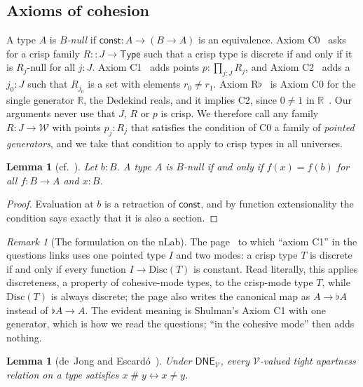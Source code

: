 \documentclass[11pt]{amsart}
\newtheorem{lemma}[theorem]{Lemma}
\theoremstyle{definition}
\theoremstyle{remark}
\newtheorem{remark}[theorem]{Remark}
\newcommand{\V}{\mathcal V}
\newcommand{\W}{\mathcal W}
\newcommand{\R}{\mathbb R}
\newcommand{\crisp}{\mathrel{::}}
\newcommand{\DNE}{\mathsf{DNE}}
\newcommand{\const}{\mathsf{const}}
\newcommand{\ap}{\mathrel{\#}}
\begin{document}
\subsection*{Axioms of cohesion}
A type $A$ is \emph{$B$-null} if $\const:A\to(B\to A)$ is an
equivalence. Axiom C0~\cite[\S8.1]{Shulman2018} asks for a crisp family
$R\crisp J\to\mathsf{Type}$ such that a crisp type is discrete if and
only if it is $R_j$-null for all $j:J$. Axiom
C1~\cite[\S8.2]{Shulman2018} adds points $p:\prod_{j:J}R_j$, and Axiom
C2~\cite[\S9]{Shulman2018} adds a $j_0:J$ such that $R_{j_0}$ is a set
with elements $r_0\neq r_1$. Axiom R$\flat$~\cite[\S8]{Shulman2018} is
Axiom C0 for the single generator $\R$, the Dedekind reals, and it implies
C2, since $0\neq1$ in $\R$~\cite[\S9]{Shulman2018}. Our arguments never
use that $J$, $R$ or $p$ is crisp. We therefore call any family
$R:J\to\W$ with points $p_j:R_j$ that satisfies the condition of C0 a
family of \emph{pointed generators}, and we take that condition to apply
to crisp types in all universes.

\begin{lemma}[{cf.~\cite[Lemma~8.7]{Shulman2018}}]\label{lem:null}
Let $b:B$. A type $A$ is $B$-null if and only if $f(x)=f(b)$ for all
$f:B\to A$ and $x:B$.
\end{lemma}

\begin{proof}
Evaluation at $b$ is a retraction of $\const$, and by function
extensionality the condition says exactly that it is also a section.
\end{proof}

\begin{remark}[The formulation on the nLab]\label{rem:nlab}
The page~\cite{nLabPunctual} to which ``axiom C1'' in the questions
links uses one pointed type $I$ and two modes: a crisp type $T$ is
discrete if and only if every function $I\to\mathrm{Disc}(T)$ is
constant. Read literally, this applies discreteness, a property of
cohesive-mode types, to the crisp-mode type $T$, while $\mathrm{Disc}(T)$
is always discrete; the page also writes the canonical map as $A\to\flat A$
instead of $\flat A\to A$. The evident meaning is Shulman's Axiom C1
with one generator, which is how we read the questions; ``in the
cohesive mode'' then adds nothing.
\end{remark}

\begin{lemma}[{de~Jong and Escard\'o~\cite{TypeTopology}}]\label{lem:classical}
Under $\DNE_\V$, every $\V$-valued tight apartness relation on a type
satisfies $x\ap y\leftrightarrow x\neq y$.
\end{lemma}
\end{document}
